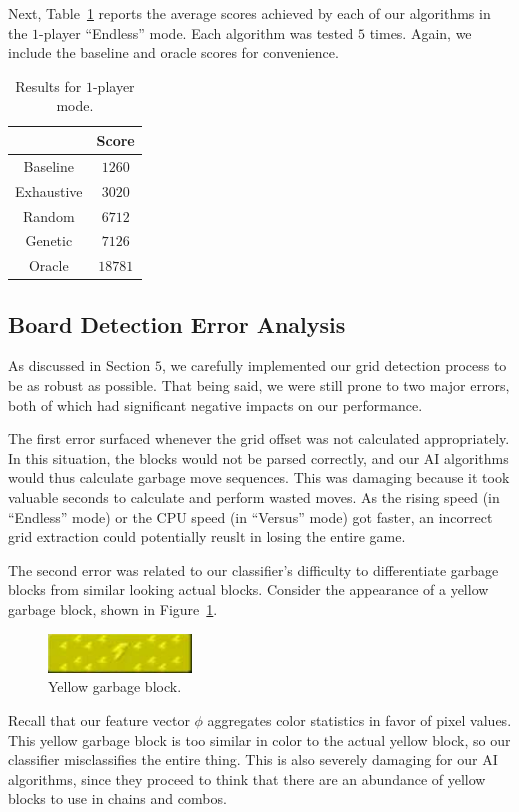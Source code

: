 \documentclass[12pt]{IEEEtran}
\begin{document}
Next, Table~\ref{tab:endless} reports the average scores achieved by each of our algorithms in the $1$-player ``Endless'' mode. Each algorithm was tested $5$ times. Again, we include the baseline and oracle scores for convenience.

\begin{table}[ht]
\begin{center}
\begin{tabular}{c||c}
& Score \\ \hline\hline
Baseline & $1260$ \\ \hline
Exhaustive & $3020$ \\ \hline
Random & $6712$ \\ \hline
Genetic & $7126$ \\ \hline
Oracle & $18781$
\end{tabular}
\end{center}
\caption{Results for $1$-player mode.}
\label{tab:endless}
\end{table}

\subsection{Board Detection Error Analysis}

As discussed in Section $5$, we carefully implemented our grid detection process to be as robust as possible. That being said, we were still prone to two major errors, both of which had significant negative impacts on our performance.

The first error surfaced whenever the grid offset was not calculated appropriately. In this situation, the blocks would not be parsed correctly, and our AI algorithms would thus calculate garbage move sequences. This was damaging because it took valuable seconds to calculate and perform wasted moves. As the rising speed (in ``Endless'' mode) or the CPU speed (in ``Versus'' mode) got faster, an incorrect grid extraction could potentially reuslt in losing the entire game.

The second error was related to our classifier's difficulty to differentiate garbage blocks from similar looking actual blocks. Consider the appearance of a yellow garbage block, shown in Figure~\ref{fig:garbage}.
\begin{figure}[h!]
\centerline{\includegraphics[width=1.5in]{garbage.png}}
\caption{Yellow garbage block.}
\label{fig:garbage}
\end{figure}
Recall that our feature vector $\phi$ aggregates color statistics in favor of pixel values. This yellow garbage block is too similar in color to the actual yellow block, so our classifier misclassifies the entire thing. This is also severely damaging for our AI algorithms, since they proceed to think that there are an abundance of yellow blocks to use in chains and combos.
\end{document}
